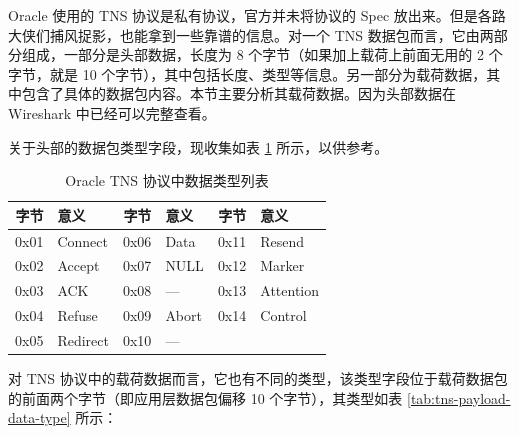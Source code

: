 Oracle 使用的 TNS 协议是私有协议，官方并未将协议的 Spec 放出来。但是各路大侠们捕风捉影，也能拿到一些靠谱的信息。对一个 TNS 数据包而言，它由两部分组成，一部分是头部数据，长度为 8 个字节（如果加上载荷上前面无用的 2 个字节，就是 10 个字节），其中包括长度、类型等信息。另一部分为载荷数据，其中包含了具体的数据包内容。本节主要分析其载荷数据。因为头部数据在 Wireshark 中已经可以完整查看。

关于头部的数据包类型字段，现收集如表 \ref{tab:oracle-tns-data-type} 所示，以供参考。

\begin{table}[!h]
    \centering
    \caption{Oracle TNS 协议中数据类型列表}
    \begin{tabular}{|>{\cf\scriptsize}r|>{\scriptsize}l|>{\cf\scriptsize}r|>{\scriptsize}l|>{\cf\scriptsize}r|>{\scriptsize}l|} \hline
        字节  & 意义              & 字节 & 意义           & 字节 & 意义                   \\ \hline\hline
         0x01 & Connect           & 0x06 & Data           & 0x11 & Resend                 \\ \hline
         0x02 & Accept            & 0x07 & NULL           & 0x12 & Marker                 \\ \hline 
         0x03 & ACK               & 0x08 & ---            & 0x13 & Attention              \\ \hline
         0x04 & Refuse            & 0x09 & Abort          & 0x14 & Control                \\ \hline
         0x05 & Redirect          & 0x10 & ---            &      &                        \\ \hline
    \end{tabular}
    \label{tab:oracle-tns-data-type}
\end{table}

对 TNS 协议中的载荷数据而言，它也有不同的类型，该类型字段位于载荷数据包的前面两个字节（即应用层数据包偏移 10 个字节），其类型如表 \ref{tab:tns-payload-data-type} 所示：

